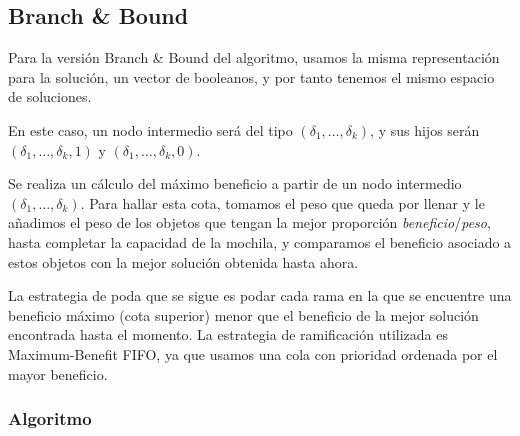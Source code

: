 \documentclass[a4paper, 11pt]{article} %
\begin{document}
  	
          \small
    	\texttt{}
          \normalsize
    

  \subsection{Branch \& Bound}
  
  Para la versión Branch \& Bound del algoritmo, usamos la misma representación para la solución, un vector de booleanos, y por tanto tenemos el mismo espacio de soluciones.
  
  En este caso, un nodo intermedio será del tipo $(\delta_1, \dots, \delta_k)$, y sus hijos serán $(\delta_1, \dots, \delta_k, 1)$ y $(\delta_1, \dots, \delta_k, 0)$.
  
  Se realiza un cálculo del máximo beneficio a partir de un nodo intermedio $(\delta_1, \dots, \delta_k)$. Para hallar esta cota, tomamos el peso que queda por llenar y le añadimos el peso de los objetos que tengan la mejor proporción \textit{beneficio}/\textit{peso}, hasta completar la capacidad de la mochila, y comparamos el beneficio asociado a estos objetos con la mejor solución obtenida hasta ahora.
  
  La estrategia de poda que se sigue es podar cada rama en la que se encuentre una beneficio máximo (cota superior) menor que el beneficio de la mejor solución encontrada hasta el momento. La estrategia de ramificación utilizada es Maximum-Benefit FIFO, ya que usamos una cola con prioridad ordenada por el mayor beneficio.
  
	\subsubsection{Algoritmo}
\end{document}
